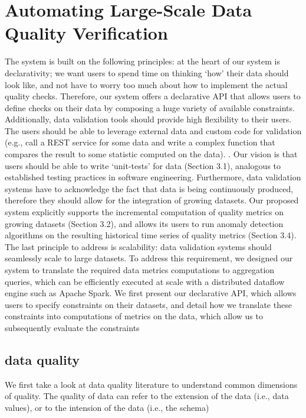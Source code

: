 \documentclass{article}
\begin{document}
\section{Automating Large-Scale Data Quality Verification}
The system is built on the following principles: at the heart of our system is declarativity; we
want users to spend time on thinking ‘how’ their data should
look like, and not have to worry too much about how to implement the actual quality checks. Therefore, our system offers a declarative API that allows users to define checks on their data by composing a huge variety of available constraints.
Additionally, data validation tools should provide
high flexibility to their users. The users should be able to
leverage external data and custom code for validation (e.g.,
call a REST service for some data and write a complex function that compares the result to some statistic computed on
the data).
. Our vision is that users should be able to write
‘unit-tests’ for data (Section 3.1), analogous to established
testing practices in software engineering. Furthermore, data
validation systems have to acknowledge the fact that data is
being continuously produced, therefore they should allow for
the integration of growing datasets. Our proposed system
explicitly supports the incremental computation of quality
metrics on growing datasets (Section 3.2), and allows its
users to run anomaly detection algorithms on the resulting
historical time series of quality metrics (Section 3.4). The
last principle to address is scalability: data validation systems should seamlessly scale to large datasets. To address
this requirement, we designed our system to translate the
required data metrics computations to aggregation queries,
which can be efficiently executed at scale with a distributed
dataflow engine such as Apache Spark.
We first present our declarative API, which allows users to specify constraints on their
datasets, and detail how we translate these constraints into
computations of metrics on the data, which allow us to subsequently evaluate the constraints
\subsection{data quality}
We first take a look at data quality literature to understand common dimensions of quality. The quality of data
can refer to the extension of the data (i.e., data values), or to
the intension of the data (i.e., the schema)
\end{document}
